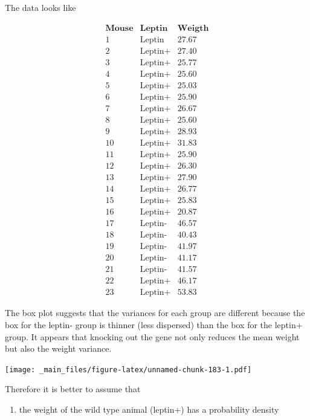 \documentclass[
]{book}
\providecommand{\tightlist}{%
  \setlength{\itemsep}{0pt}\setlength{\parskip}{0pt}}
\begin{document}
The data looks like

\[
\begin{array}{ccc}
\mathbf{Mouse} & \mathbf{Leptin} & \mathbf{Weigth} \\ 
1 &\text{Leptin}  &27.67\\
2 &\text{Leptin+}  &27.40\\
3 &\text{Leptin+}  &25.77\\
4 &\text{Leptin+}  &25.60\\
5 &\text{Leptin+}  &25.03\\
6 &\text{Leptin+}  &25.90\\
7 &\text{Leptin+}  &26.67\\
8 &\text{Leptin+}  &25.60\\
9 &\text{Leptin+}  &28.93\\
10 &\text{Leptin+}  &31.83\\
11 &\text{Leptin+}  &25.90\\
12 &\text{Leptin+}  &26.30\\
13 &\text{Leptin+}  &27.90\\
14 &\text{Leptin+}  &26.77\\
15 &\text{Leptin+}  &25.83\\
16 &\text{Leptin+}  &20.87\\
17 &\text{Leptin-}  &46.57\\
18 &\text{Leptin-}  &40.43\\
19 &\text{Leptin-}  &41.97\\
20 &\text{Leptin-}  &41.17\\
21 &\text{Leptin-}  &41.57\\
22 &\text{Leptin+}  &46.17\\
23 &\text{Leptin+}  &53.83
\end{array}
\]

The box plot suggests that the variances for each group are different because the box for the leptin- group is thinner (less dispersed) than the box for the leptin+ group. It appears that knocking out the gene not only reduces the mean weight but also the weight variance.

\texttt{[image: \_main\_files/figure-latex/unnamed-chunk-183-1.pdf]}

Therefore it is better to assume that

\begin{enumerate}
\def\labelenumi{\arabic{enumi}.}
\tightlist
\item
  the weight of the wild type animal (leptin+) has a probability density
\end{enumerate}
\end{document}

